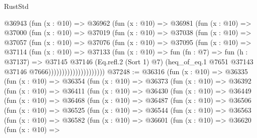 \begin{lexlean}{RustStd}
\begin{coremodule}
{\begin{coremodule}
{{{{{{{{{{{{{{{{{{{{{{{{{{{{{{{{{{{{{{{{{{{{{{{{{{{{{                    @36943
                      (fun (x : @10) =>
                      @36962
                        (fun (x : @10) =>
                        @36981
                          (fun (x : @10) =>
                          @37000
                            (fun (x : @10) =>
                            @37019
                              (fun (x : @10) =>
                              @37038
                                (fun (x : @10) =>
                                @37057
                                  (fun (x : @10) =>
                                  @37076
                                    (fun (x : @10) =>
                                    @37095
                                      (fun (x : @10) =>
                                      @37114
                                        (fun (x : @10) =>
                                        @37133
                                          (fun (x : @10) =>
                                          fun (fn : @7) =>
                                          fun (h : @37137) =>
                                          @37145
                                            @37146
                                            (Eq.refl.{2} (Sort 1) @7)
                                            (heq_of_eq.{1}
                                              @7651
                                              @37143
                                              @37146
                                              @7666)))))))))))))))))))))
@37248 := @36316
    (fun (x : @10) =>
    @36335
      (fun (x : @10) =>
      @36354
        (fun (x : @10) =>
        @36373
          (fun (x : @10) =>
          @36392
            (fun (x : @10) =>
            @36411
              (fun (x : @10) =>
              @36430
                (fun (x : @10) =>
                @36449
                  (fun (x : @10) =>
                  @36468
                    (fun (x : @10) =>
                    @36487
                      (fun (x : @10) =>
                      @36506
                        (fun (x : @10) =>
                        @36525
                          (fun (x : @10) =>
                          @36544
                            (fun (x : @10) =>
                            @36563
                              (fun (x : @10) =>
                              @36582
                                (fun (x : @10) =>
                                @36601
                                  (fun (x : @10) =>
                                  @36620
                                    (fun (x : @10) =>
}}}}}}}}}}}}}}}}}}}}}}}}}}}}}}}}}}}}}}}}}}}}}}}}}}}}}
\end{coremodule}}
\end{coremodule}
\end{lexlean}
